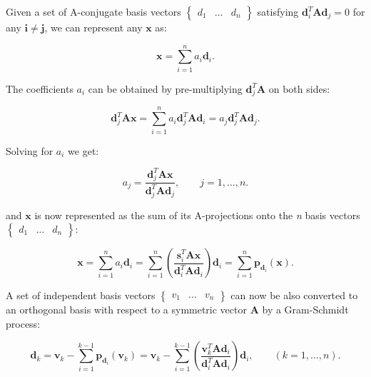 \documentclass[10pt,b5paper,titlepage]{book}
\begin{document}
Given a set of A-conjugate basis vectors $\begin{Bmatrix} d_1 & \ldots & d_n \end{Bmatrix}$
satisfying $\mathbf{d}_{i}^{T}\mathbf{A}\mathbf{d}_{j} = 0$ for any $\mathbf{i \neq j}$,
we can represent any $\mathbf{x}$ as:

\begin{equation}
    \mathbf{x} = \sum_{i=1}^{n} a_{i}\mathbf{d}_{i}
.\end{equation}

The coefficients $a_{i}$ can be obtained by pre-multiplying $\mathbf{d}_{j}^{T}\mathbf{A}$
on both sides:

\begin{equation}
    \mathbf{d}_{j}^{T}\mathbf{A}\mathbf{x}
    = \sum_{i=1}^{n} a_{i}\mathbf{d}_{j}^{T}\mathbf{A}\mathbf{d}_{i}
    = a_{j}\mathbf{d}_{j}^{T}\mathbf{A}\mathbf{d}_{j}
.\end{equation}

Solving for $a_{i}$ we get:

\begin{equation}
    a_{j} = \frac{\mathbf{d}_{j}^{T}\mathbf{A}\mathbf{x}}{\mathbf{d}_{j}^{T}\mathbf{A}\mathbf{d}_{j}}
    ,\qquad j = 1,\ldots,n
.\end{equation}

and $\mathbf{x}$ is now represented as the sum of its A-projections onto the
\textit{n} basis vectors $\begin{Bmatrix} d_1 & \ldots & d_n \end{Bmatrix}$:

\begin{equation}
    \mathbf{x}
    = \sum_{i=1}^{n} a_{i}\mathbf{d}_{i}
    = \sum_{i=1}^{n} \left(
    \frac{\mathbf{s}_{i}^{T}\mathbf{A}\mathbf{x}}{\mathbf{d}_{i}^{T}\mathbf{A}\mathbf{d}_{i}}
    \right) \mathbf{d}_{i}
    = \sum_{i=1}^{n} \mathbf{p}_{\mathbf{d}_{i}}(\mathbf{x})
.\end{equation}

A set of independent basis vectors $\begin{Bmatrix} v_1 & \ldots & v_n \end{Bmatrix}$
can now be also converted to an orthogonal basis with respect to a symmetric
vector $\mathbf{A}$ by a Gram-Schmidt process:

\begin{equation}
    \mathbf{d}_{k} = \mathbf{v}_{k}
    - \sum_{i=1}^{k-1} \mathbf{p}_{\mathbf{d}_{i}}(\mathbf{v}_{k})
    = \mathbf{v}_{k}
    - \sum_{i=1}^{k-1} \left(
    \frac{\mathbf{v}_{k}^{T}\mathbf{A}\mathbf{d}_{i}}
    {\mathbf{d}_{i}^{T}\mathbf{A}\mathbf{d}_{i}} \right) \mathbf{d}_{i}
    , \qquad (k = 1, \ldots, n)
.\end{equation}
\end{document}
